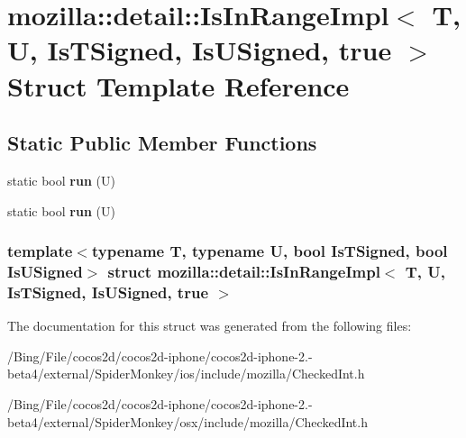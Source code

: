 \hypertarget{structmozilla_1_1detail_1_1_is_in_range_impl_3_01_t_00_01_u_00_01_is_t_signed_00_01_is_u_signed_00_01true_01_4}{\section{mozilla\-:\-:detail\-:\-:Is\-In\-Range\-Impl$<$ T, U, Is\-T\-Signed, Is\-U\-Signed, true $>$ Struct Template Reference}
\label{structmozilla_1_1detail_1_1_is_in_range_impl_3_01_t_00_01_u_00_01_is_t_signed_00_01_is_u_signed_00_01true_01_4}
}
\subsection*{Static Public Member Functions}
\begin{DoxyCompactItemize}
\item 
\hypertarget{structmozilla_1_1detail_1_1_is_in_range_impl_3_01_t_00_01_u_00_01_is_t_signed_00_01_is_u_signed_00_01true_01_4_a7b00801e6efa6dc8dcb0469bf412eaaa}{static bool {\bfseries run} (U)}\label{structmozilla_1_1detail_1_1_is_in_range_impl_3_01_t_00_01_u_00_01_is_t_signed_00_01_is_u_signed_00_01true_01_4_a7b00801e6efa6dc8dcb0469bf412eaaa}

\item 
\hypertarget{structmozilla_1_1detail_1_1_is_in_range_impl_3_01_t_00_01_u_00_01_is_t_signed_00_01_is_u_signed_00_01true_01_4_a7b00801e6efa6dc8dcb0469bf412eaaa}{static bool {\bfseries run} (U)}\label{structmozilla_1_1detail_1_1_is_in_range_impl_3_01_t_00_01_u_00_01_is_t_signed_00_01_is_u_signed_00_01true_01_4_a7b00801e6efa6dc8dcb0469bf412eaaa}

\end{DoxyCompactItemize}
\subsubsection*{template$<$typename T, typename U, bool Is\-T\-Signed, bool Is\-U\-Signed$>$ struct mozilla\-::detail\-::\-Is\-In\-Range\-Impl$<$ T, U, Is\-T\-Signed, Is\-U\-Signed, true $>$}



The documentation for this struct was generated from the following files\-:\begin{DoxyCompactItemize}
\item 
/\-Bing/\-File/cocos2d/cocos2d-\/iphone/cocos2d-\/iphone-\/2.-\/beta4/external/\-Spider\-Monkey/ios/include/mozilla/Checked\-Int.\-h\item 
/\-Bing/\-File/cocos2d/cocos2d-\/iphone/cocos2d-\/iphone-\/2.-\/beta4/external/\-Spider\-Monkey/osx/include/mozilla/Checked\-Int.\-h\end{DoxyCompactItemize}
